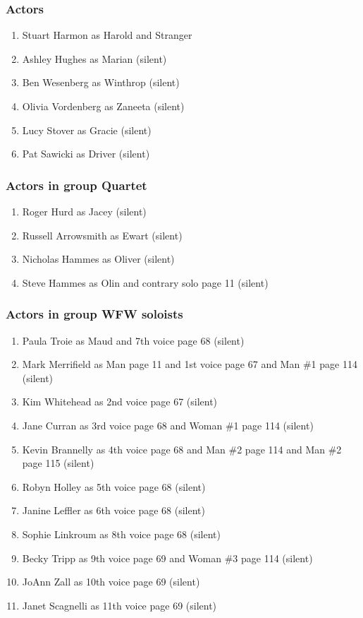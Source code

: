 \subsubsection{Actors}
\begin{enumerate}
\item Stuart Harmon as Harold and Stranger
\item Ashley Hughes as Marian (silent)
\item Ben Wesenberg as Winthrop (silent)
\item Olivia Vordenberg as Zaneeta (silent)
\item Lucy Stover as Gracie (silent)
\item Pat Sawicki as Driver (silent)
\end{enumerate}
\subsubsection{Actors in group Quartet}
\begin{enumerate}
\item Roger Hurd as Jacey (silent)
\item Russell Arrowsmith as Ewart (silent)
\item Nicholas Hammes as Oliver (silent)
\item Steve Hammes as Olin and contrary solo page 11 (silent)
\end{enumerate}
\subsubsection{Actors in group WFW soloists}
\begin{enumerate}
\item Paula Troie as Maud and 7th voice page 68 (silent)
\item Mark Merrifield as Man page 11 and 1st voice page 67 and Man \#1 page 114 (silent)
\item Kim Whitehead as 2nd voice page 67 (silent)
\item Jane Curran as 3rd voice page 68 and Woman \#1 page 114 (silent)
\item Kevin Brannelly as 4th voice page 68 and Man \#2 page 114 and Man \#2 page 115 (silent)
\item Robyn Holley as 5th voice page 68 (silent)
\item Janine Leffler as 6th voice page 68 (silent)
\item Sophie Linkroum as 8th voice page 68 (silent)
\item Becky Tripp as 9th voice page 69 and Woman \#3 page 114 (silent)
\item JoAnn Zall as 10th voice page 69 (silent)
\item Janet Scagnelli as 11th voice page 69 (silent)
\end{enumerate}

